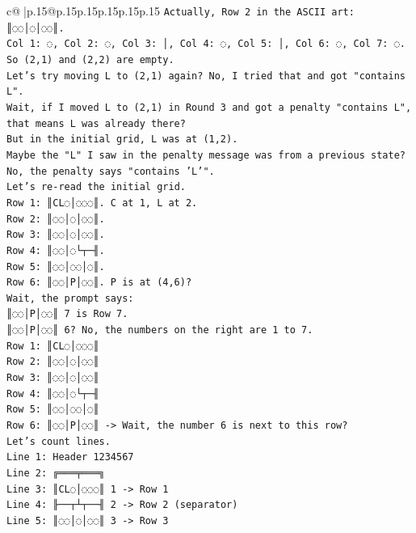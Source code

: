 \documentclass{article}
\begin{document}
{\begin{supertabular}{c@{$\;$}|p{.15\linewidth}@{}p{.15\linewidth}p{.15\linewidth}p{.15\linewidth}p{.15\linewidth}p{.15\linewidth}}
{{{\texttt{Actually, Row 2 in the ASCII art: ║◌◌│◌│◌◌║.} \\
\texttt{Col 1: ◌, Col 2: ◌, Col 3: │, Col 4: ◌, Col 5: │, Col 6: ◌, Col 7: ◌.} \\
\texttt{So (2,1) and (2,2) are empty.} \\
\texttt{Let's try moving L to (2,1) again? No, I tried that and got "contains L".} \\
\texttt{Wait, if I moved L to (2,1) in Round 3 and got a penalty "contains L", that means L was already there?} \\
\texttt{But in the initial grid, L was at (1,2).} \\
\texttt{Maybe the "L" I saw in the penalty message was from a previous state?} \\
\texttt{No, the penalty says "contains 'L'".} \\
\texttt{Let's re{-}read the initial grid.} \\
\texttt{Row 1: ║CL◌│◌◌◌║. C at 1, L at 2.} \\
\texttt{Row 2: ║◌◌│◌│◌◌║.} \\
\texttt{Row 3: ║◌◌│◌│◌◌║.} \\
\texttt{Row 4: ║◌◌│◌└┬─╢.} \\
\texttt{Row 5: ║◌◌│◌◌│◌║.} \\
\texttt{Row 6: ║◌◌│P│◌◌║. P is at (4,6)?} \\
\texttt{Wait, the prompt says:} \\
\texttt{║◌◌│P│◌◌║ 7 is Row 7.} \\
\texttt{║◌◌│P│◌◌║ 6? No, the numbers on the right are 1 to 7.} \\
\texttt{Row 1: ║CL◌│◌◌◌║} \\
\texttt{Row 2: ║◌◌│◌│◌◌║} \\
\texttt{Row 3: ║◌◌│◌│◌◌║} \\
\texttt{Row 4: ║◌◌│◌└┬─╢} \\
\texttt{Row 5: ║◌◌│◌◌│◌║} \\
\texttt{Row 6: ║◌◌│P│◌◌║ {-}> Wait, the number 6 is next to this row?} \\
\texttt{Let's count lines.} \\
\texttt{Line 1: Header  1234567} \\
\texttt{Line 2: ╔═══╤═══╗} \\
\texttt{Line 3: ║CL◌│◌◌◌║ 1 {-}> Row 1} \\
\texttt{Line 4: ╟──┬┴┬──╢ 2 {-}> Row 2 (separator)} \\
\texttt{Line 5: ║◌◌│◌│◌◌║ 3 {-}> Row 3} \\
}}}
\end{supertabular}}
\end{document}
